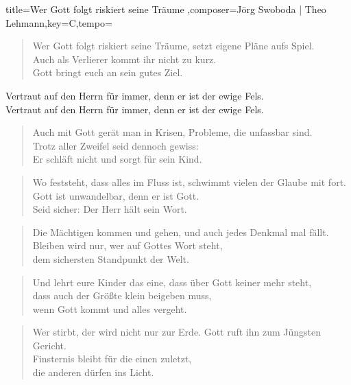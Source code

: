\documentclass{leadsheet}
\begin{document}
\begin{song}{title={Wer Gott folgt riskiert seine Träume
},composer={Jörg Swoboda | Theo Lehmann},key={C},tempo={}}

\begin{schedule}
\end{schedule}

\begin{intro}
\end{intro}

\begin{verse}
Wer Gott folgt riskiert seine Träume, 
setzt eigene Pläne aufs Spiel. \\
Auch als Verlierer kommt ihr nicht zu kurz. \\
Gott bringt euch an sein gutes Ziel.
\end{verse}

\begin{chorus}
Vertraut auf den Herrn für immer,
denn er ist der ewige Fels. \\
Vertraut auf den Herrn für immer,
denn er ist der ewige Fels.
\end{chorus}

\begin{verse}
Auch mit Gott gerät man in Krisen,
Probleme, die unfassbar sind. \\
Trotz aller Zweifel seid dennoch gewiss: \\
Er schläft nicht und sorgt für sein Kind.
\end{verse}

\begin{verse}
Wo feststeht, dass alles im Fluss ist,
schwimmt vielen der Glaube mit fort. \\
Gott ist unwandelbar, denn er ist Gott. \\
Seid sicher: Der Herr hält sein Wort.
\end{verse}

\begin{verse}
Die Mächtigen kommen und gehen,
und auch jedes Denkmal mal fällt. \\
Bleiben wird nur, wer auf Gottes Wort steht, \\
dem sichersten Standpunkt der Welt.
\end{verse}

\begin{verse}
Und lehrt eure Kinder das eine,
dass über Gott keiner mehr steht, \\
dass auch der Größte klein beigeben muss, \\
wenn Gott kommt und alles vergeht.
\end{verse}

\begin{verse}
Wer stirbt, der wird nicht nur zur Erde.
Gott ruft ihn zum Jüngsten Gericht. \\
Finsternis bleibt für die einen zuletzt, \\
die anderen dürfen ins Licht.
\end{verse}

\end{song}
\end{document}
